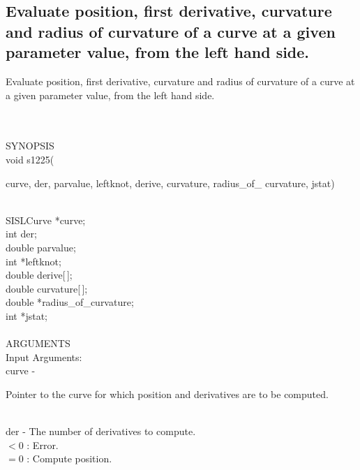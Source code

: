 \subsection{Evaluate position, first derivative, curvature and radius of curvature of a curve at a given parameter value, from the left hand side.}
\begin{minipg1}
Evaluate position, first derivative, curvature and radius of
               curvature of a curve at a given parameter value, from the
               left hand side.
\end{minipg1} \\ \\
SYNOPSIS\\
        \> void s1225(\begin{minipg3}
            {\fov curve}, {\fov der}, {\fov parvalue}, {\fov leftknot}, {\fov derive}, {\fov curvature},
	   radius\_of\_ {\fov curvature}, {\fov jstat})
                \end{minipg3}\\
                \>\>    SISLCurve    \>  *{\fov curve};\\
                \>\>    int    \>  {\fov der};\\
                \>\>    double \> parvalue;\\
                \>\>    int    \>  *{\fov leftknot};\\
                \>\>    double \> derive[\,];\\
                \>\>    double \> curvature[\,];\\
                \>\>    double \> *{\fov radius}\_of\_curvature;\\
                \>\>    int    \>  *{\fov jstat};\\
\\
ARGUMENTS\\
	\>Input Arguments:\\
        \>\>    {\fov curve}\> - \>  \begin{minipg2}
                     Pointer to the curve for which position
                       and derivatives are to be computed.
                               \end{minipg2}\\
        \>\>    {\fov der}\> - \> The number of derivatives to compute. \\
	            \>\>\>\>\>          $ < 0$ : Error. \\
		    \>\>\>\>\>          $ = 0$ : Compute position.\\
